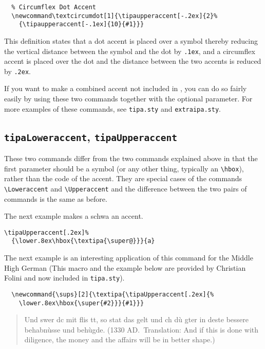 \begin{verbatim}
  % Circumflex Dot Accent
  \newcommand\textcircumdot[1]{\tipaupperaccent[-.2ex]{2}%
    {\tipaupperaccent[-.1ex]{10}{#1}}}
\end{verbatim}

This definition states that a dot accent is placed over a symbol
thereby reducing the vertical distance between the symbol and the dot
by \texttt{.1ex}, and a circumflex accent is placed over the dot and
the distance between the two accents is reduced by \texttt{.2ex}.

If you want to make a combined accent not included in \tipa{}, you can
do so fairly easily by using these two commands together with the
optional parameter. For more examples of these commands, see
\verb|tipa.sty| and \verb|extraipa.sty|.

\subsection{{\tt\tbs tipaLoweraccent}, {\tt\tbs tipaUpperaccent}}

These two commands differ from the two commands explained above in that
the first parameter should be a symbol (or any other thing, typically
an \verb|\hbox|), rather than the code of the accent. They are special
cases of the commands \verb|\Loweraccent| and \verb|\Upperaccent| and
the difference between the two pairs of commands is the same as before.

The next example makes a schwa an accent.

\begin{tipaexample}
  \yitem
    \verb|\tipaUpperaccent[.2ex]%|\\
    \verb|  {\lower.8ex\hbox{\textipa{\super@}}}{a}|
  \yitem
\end{tipaexample}

The next example is an interesting application of this command for the
Middle High German (This macro and the example below are provided
by Christian Folini and now included in \texttt{tipa.sty}).

\begin{verbatim}
  \newcommand{\sups}[2]{\textipa{\tipaUpperaccent[.2ex]{%
    \lower.8ex\hbox{\super{#2}}}{#1}}}
\end{verbatim}

\begin{quote}
Und swer dc mit flis tt, so stat das gelt und ch
d\`{u} gter in deste bessere behabn\`{u}sse und
beh\`{u}gde.  (1330 AD.\ Translation: And if this is done with
diligence, the money and the affairs will be in better shape.)
\end{quote}

